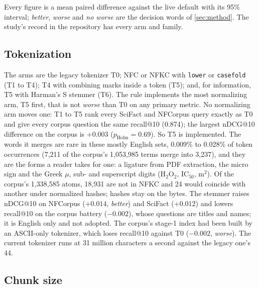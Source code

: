 \documentclass[11pt]{article}
\theoremstyle{plain}
\theoremstyle{definition}
\theoremstyle{remark}
\newcommand{\code}[1]{\texttt{#1}}
\begin{document}
Every figure is a mean paired difference against the live default with its 95\% interval;
\emph{better}, \emph{worse} and \emph{no worse} are the decision words of \cref{sec:method}. The
study's record in the repository has every arm and family.

\subsection{Tokenization}\label{sec:tok-results}

The arms are the legacy tokenizer T0; NFC or NFKC with \code{lower} or \code{casefold} (T1 to
T4); T4 with combining marks inside a token (T5); and, for information, T5 with Harman's S stemmer
(T6). The rule implements the most normalizing arm, T5 first, that is not \emph{worse} than T0 on
any primary metric. No normalizing arm moves one: T1 to T5 rank every SciFact and NFCorpus query
exactly as T0 and give every corpus question the same recall@10 (0.874); the largest nDCG@10
difference on the corpus is $+0.003$ ($p_{\text{Holm}} = 0.69$). So T5 is implemented. The words it
merges are rare in these mostly English sets, 0.009\% to 0.028\% of token occurrences (7{,}211 of
the corpus's 1{,}053{,}985 terms merge into 3{,}237), and they are the forms a reader takes for one:
a ligature from PDF extraction, the micro sign and the Greek $\mu$, sub- and superscript digits
(H$_2$O$_2$, IC$_{50}$, m$^2$). Of the corpus's 1{,}338{,}585 atoms, 18{,}931 are not in NFKC and 24
would coincide with another under normalized hashes; hashes stay on the bytes. The stemmer raises
nDCG@10 on NFCorpus ($+0.014$, \emph{better}) and SciFact ($+0.012$) and lowers recall@10 on the
corpus battery ($-0.002$), whose questions are titles and names; it is English only and not
adopted. The corpus's stage-1 index had been built by an ASCII-only tokenizer, which loses
recall@10 against T0 ($-0.002$, \emph{worse}). The current tokenizer runs at 31 million characters a
second against the legacy one's 44.

\subsection{Chunk size}
\end{document}
